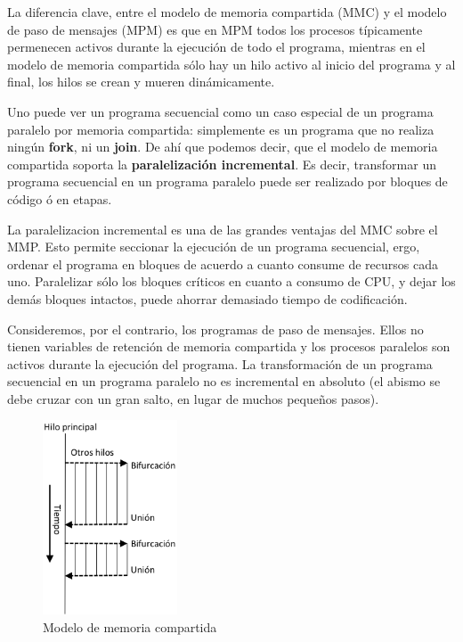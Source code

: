 \documentclass[12pt,letterpaper]{book}
\begin{document}
La diferencia clave, entre el modelo de memoria compartida (MMC) y el modelo de paso de mensajes (MPM) es que en MPM todos los procesos típicamente permenecen activos durante la ejecución de todo el programa, mientras en el modelo de memoria compartida sólo hay un hilo activo al inicio del programa y al final, los hilos se crean y mueren dinámicamente.

Uno puede ver un programa secuencial como un caso especial de un programa paralelo por memoria compartida: simplemente es un programa que no realiza ningún \textbf{fork}, ni un \textbf{join}. De ahí que podemos decir, que el modelo de memoria compartida soporta la \textbf{paralelización incremental}. Es decir, transformar un programa secuencial en un programa paralelo puede ser realizado por bloques de código ó en etapas.

La paralelizacion incremental es una de las grandes ventajas del MMC sobre el MMP. Esto permite seccionar la ejecución de un programa secuencial, ergo, ordenar el programa en bloques de acuerdo a cuanto consume de recursos cada uno. Paralelizar sólo los bloques críticos en cuanto a consumo de CPU, y dejar los demás bloques intactos, puede ahorrar demasiado tiempo de codificación.

Consideremos, por el contrario, los programas de paso de mensajes. Ellos no tienen variables de retención de memoria compartida y los procesos paralelos son activos durante la ejecución del programa. La transformación de un programa secuencial en un programa paralelo no es incremental en absoluto (el abismo se debe cruzar con un gran salto, en lugar de muchos pequeños pasos).

\begin{figure}
\begin{center}
\includegraphics[width=4cm]{../imagenes/fork_join.png} 
\end{center}
\caption{Modelo de memoria compartida}
\label{fig:fork_join}
\end{figure}
\end{document}
